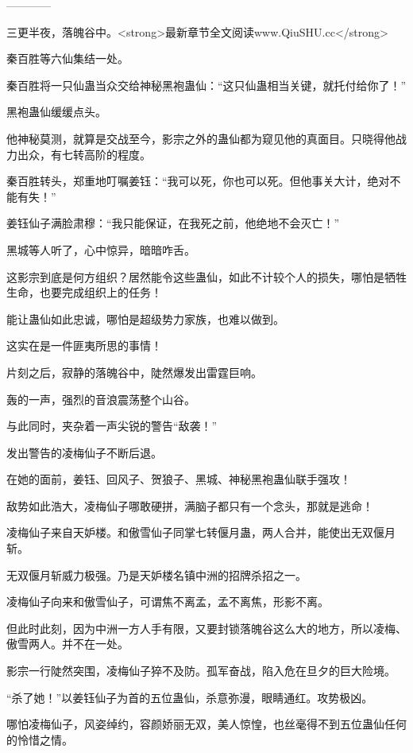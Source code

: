 
\begin{this_body}

------------

三更半夜，落魄谷中。<strong>最新章节全文阅读www.QiuSHU.cc</strong>

秦百胜等六仙集结一处。

秦百胜将一只仙蛊当众交给神秘黑袍蛊仙：“这只仙蛊相当关键，就托付给你了！”

黑袍蛊仙缓缓点头。

他神秘莫测，就算是交战至今，影宗之外的蛊仙都为窥见他的真面目。只晓得他战力出众，有七转高阶的程度。

秦百胜转头，郑重地叮嘱姜钰：“我可以死，你也可以死。但他事关大计，绝对不能有失！”

姜钰仙子满脸肃穆：“我只能保证，在我死之前，他绝地不会灭亡！”

黑城等人听了，心中惊异，暗暗咋舌。

这影宗到底是何方组织？居然能令这些蛊仙，如此不计较个人的损失，哪怕是牺牲生命，也要完成组织上的任务！

能让蛊仙如此忠诚，哪怕是超级势力家族，也难以做到。

这实在是一件匪夷所思的事情！

片刻之后，寂静的落魄谷中，陡然爆发出雷霆巨响。

轰的一声，强烈的音浪震荡整个山谷。

与此同时，夹杂着一声尖锐的警告“敌袭！”

发出警告的凌梅仙子不断后退。

在她的面前，姜钰、回风子、贺狼子、黑城、神秘黑袍蛊仙联手强攻！

敌势如此浩大，凌梅仙子哪敢硬拼，满脑子都只有一个念头，那就是逃命！

凌梅仙子来自天妒楼。和傲雪仙子同掌七转偃月蛊，两人合并，能使出无双偃月斩。

无双偃月斩威力极强。乃是天妒楼名镇中洲的招牌杀招之一。

凌梅仙子向来和傲雪仙子，可谓焦不离孟，孟不离焦，形影不离。

但此时此刻，因为中洲一方人手有限，又要封锁落魄谷这么大的地方，所以凌梅、傲雪两人。并不在一处。

影宗一行陡然突围，凌梅仙子猝不及防。孤军奋战，陷入危在旦夕的巨大险境。

“杀了她！”以姜钰仙子为首的五位蛊仙，杀意弥漫，眼睛通红。攻势极凶。

哪怕凌梅仙子，风姿绰约，容颜娇丽无双，美人惊惶，也丝毫得不到五位蛊仙任何的怜惜之情。


\end{this_body}
